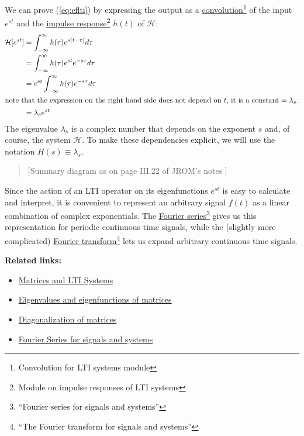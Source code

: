 \documentclass[11pt]{article}
\def\ul{\underline}
\def\H{\mathcal{H}}
\begin{document}
We can prove (\ref{eq:eflti}) by expressing the output as a
\ul{convolution}\footnote{Convolution for LTI systems module} 
of the input $e^{st}$ and the \ul{impulse response}\footnote{Module on
impulse responses of LTI systems} $h(t)$ of $\H$:
\begin{align}
\H[e^{st}] & = \int_{-\infty}^{\infty} h(\tau)e^{s(t-\tau)} d\tau \\
& = \int_{-\infty}^{\infty} h(\tau)e^{st}e^{-s\tau} d\tau \\
& = e^{st}\int_{-\infty}^{\infty} h(\tau)e^{-s\tau} d\tau \\
\intertext{note that the expression on the right hand side does not
depend on $t$, it is a constant $= \lambda_s$.}
& = \lambda_s e^{st}
\end{align}
The eigenvalue $\lambda_s$ is a complex number that depends on the
exponent $s$ and, of course, the system $\H$.  To make these
dependencies explicit, we will use the notation $H(s) \equiv
\lambda_s$.

\begin{quote}
[Summary diagram as on page III.22 of JROM's notes ]
\end{quote}

Since the action of an LTI operator on its eigenfunctions $e^{st}$ is
easy to calculate and interpret, it is convenient to represent an
arbitrary signal $f(t)$ as a linear combination of complex
exponentials.  The \ul{Fourier series}\footnote{``Fourier series for
signals and systems''} gives us this representation
for periodic continuous time signals, while the (slightly more
complicated) \ul{Fourier transform}\footnote{``The Fourier transform
for signals and systems''} lets us expand arbitrary
continuous time signals.  


\vspace{5mm}
{\large\bf Related links:}
\begin{itemize}
\item \ul{Matrices and LTI Systems}
\item \ul{Eigenvalues and eigenfunctions of matrices}
\item \ul{Diagonalization of matrices}
\item \ul{Fourier Series for signals and systems}
\end{itemize}
\end{document}
